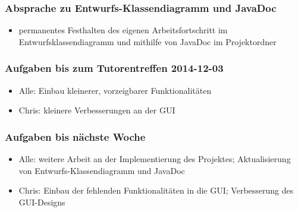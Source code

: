 \documentclass[12pt,a4paper]{article}
\begin{document}
\subsubsection*{Absprache zu Entwurfs-Klassendiagramm und JavaDoc}
\begin{itemize}
\item permanentes Festhalten des eigenen Arbeitsfortschritt im Entwurfsklassendiagramm und mithilfe von JavaDoc im Projektordner
\end{itemize}

\subsubsection*{Aufgaben bis zum Tutorentreffen 2014-12-03}
\begin{itemize}
\item Alle: Einbau kleinerer, vorzeigbarer Funktionalitäten
\item Chris: kleinere Verbesserungen an der GUI
\end{itemize}

\subsubsection*{Aufgaben bis nächste Woche}
\begin{itemize}
\item Alle: weitere Arbeit an der Implementierung des Projektes; Aktualisierung von Entwurfs-Klassendiagramm und JavaDoc
\item Chris: Einbau der fehlenden Funktionalitäten in die GUI; Verbesserung des GUI-Designs
\end{itemize}
\end{document}
